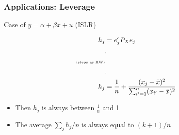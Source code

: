 \documentclass[
  shownotes,
  xcolor={svgnames},
  hyperref={colorlinks,citecolor=DarkBlue,linkcolor=DarkRed,urlcolor=DarkBlue}
  , aspectratio=169]{beamer}
\begin{document}
\begin{frame}
\frametitle{Applications: Leverage}
Case of $y=\alpha + \beta x +u$ (ISLR)

\begin{align}
h_j&=e'_j P_X e_j \\
&. \\
 \text{{\tiny (steps as HW)}}  \\
 &. \\
h_j&= \frac{1}{n}+\frac{(x_j-\bar x)^2}{\sum_{i'=1}^n(x_{i'}-\bar x)^2}
\end{align}


\begin{itemize}
\item Then $h_j$ is always between $\frac{1}{n}$ and 1
\item The average $\sum_j h_j/n$ is always equal to $(k+1)/n$
\end{itemize}


\end{frame}
\end{document}
